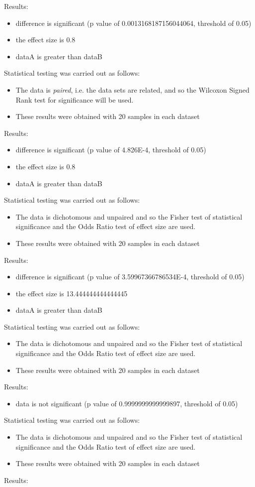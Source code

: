 \documentclass[]{article}
\begin{document}
Results:
\begin{itemize}
\item{difference is significant (p value of 0.0013168187156044064, threshold of 0.05)}
\item{the effect size is 0.8}
\item{dataA is greater than dataB}
\end{itemize}Statistical testing was carried out as follows: \begin{itemize}
\item{The data is \textit{paired}, i.e. the data sets are related, and so the Wilcoxon Signed Rank test for significance will be used.}
\item{These results were obtained with 20 samples in each dataset}
\end{itemize}Results:
\begin{itemize}
\item{difference is significant (p value of 4.826E-4, threshold of 0.05)}
\item{the effect size is 0.8}
\item{dataA is greater than dataB}
\end{itemize}Statistical testing was carried out as follows: \begin{itemize}
\item{The data is dichotomous and unpaired and so the Fisher test of statistical significance and the Odds Ratio test of effect size are used.}
\item{These results were obtained with 20 samples in each dataset}
\end{itemize}Results:
\begin{itemize}
\item{difference is significant (p value of 3.59967366786534E-4, threshold of 0.05)}
\item{the effect size is 13.444444444444445}
\item{dataA is greater than dataB}
\end{itemize}Statistical testing was carried out as follows: \begin{itemize}
\item{The data is dichotomous and unpaired and so the Fisher test of statistical significance and the Odds Ratio test of effect size are used.}
\item{These results were obtained with 20 samples in each dataset}
\end{itemize}Results:
\begin{itemize}
\item{data is not significant (p value of 0.9999999999999897, threshold of 0.05)}
\end{itemize}Statistical testing was carried out as follows: \begin{itemize}
\item{The data is dichotomous and unpaired and so the Fisher test of statistical significance and the Odds Ratio test of effect size are used.}
\item{These results were obtained with 20 samples in each dataset}
\end{itemize}Results:
\end{document}
